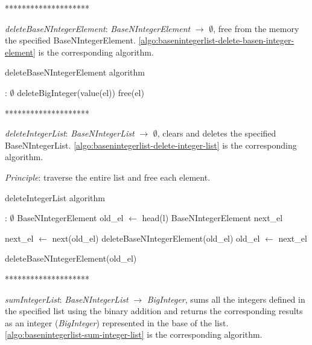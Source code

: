 \documentclass[book, nodocumentinfo]{upmethodology-document}
\newcommand{\separator}{\centerline{********************}}
\begin{document}
\separator

\emph{deleteBaseNIntegerElement}: \emph{BaseNIntegerElement} \(\rightarrow\) \(\emptyset\),
free from the memory the specified BaseNIntegerElement.
\ref{algo:basenintegerlist-delete-basen-integer-element} is the corresponding algorithm.

\begin{algorithm}[H]
    \caption{deleteBaseNIntegerElement algorithm}
    \label{algo:basenintegerlist-delete-basen-integer-element}

    \begin{algorithmic}
         : \(\emptyset\)
            \State deleteBigInteger(value(el))
            \State free(el)
        \EndFunction
    \end{algorithmic}
\end{algorithm}

\separator

\emph{deleteIntegerList}: \emph{BaseNIntegerList} \(\rightarrow\) \(\emptyset\),
clears and deletes the specified BaseNIntegerList.
\ref{algo:basenintegerlist-delete-integer-list} is the corresponding algorithm.

\emph{Principle}: traverse the entire list and free each element.

\begin{algorithm}[H]
    \caption{deleteIntegerList algorithm}
    \label{algo:basenintegerlist-delete-integer-list}

    \begin{algorithmic}
         : \(\emptyset\)
                \State BaseNIntegerElement old\_el \(\leftarrow\) head(l)
                \State BaseNIntegerElement next\_el

                    \State next\_el \(\leftarrow\) next(old\_el)
                    \State deleteBaseNIntegerElement(old\_el)
                    \State old\_el \(\leftarrow\) next\_el
                \EndWhile

                \State deleteBaseNIntegerElement(old\_el)
            \EndIf
        \EndFunction
    \end{algorithmic}
\end{algorithm}

\separator

\emph{sumIntegerList}: \emph{BaseNIntegerList} \(\rightarrow\) \emph{BigInteger},
sums all the integers defined in the specified list using the binary addition and returns
the corresponding results as an integer (\emph{BigInteger}) represented in the base of the list.
\ref{algo:basenintegerlist-sum-integer-list} is the corresponding algorithm.
\end{document}
